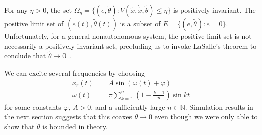 For any $\eta > 0$, the set $\Omega_\eta = \{(e, \tilde{\theta}): V(\tilde{x},
\dot{\tilde{x}}, \tilde{\theta}) \leq \eta\}$ is positively invariant. The
positive limit set of $(e(t),\tilde{\theta}(t))$ is a subset of $E = \{(e,
\tilde{\theta}): e = 0\}$. Unfortunately, for a general nonautonomous system,
the positive limit set is not necessarily a positively invariant set, precluding
us to invoke LaSalle's theorem to conclude that $\tilde{\theta} \rightarrow
0$~\cite{khalil2015nonlinear}.

%
We can excite several frequencies by choosing 
\begin{align*}
    x_r(t) &= A\sin{\left(\omega(t) + \varphi\right)} \\
    \omega(t) &= \pi\sum_{k=1}^n \left(1-\frac{k-1}{n}\right)\sin{k t}
\end{align*}
%
for some constants $\varphi$, $A > 0$, and a sufficiently large $n \in
\mathbb{N}$. Simulation results in the next section suggests that this coaxes
$\tilde{\theta} \rightarrow 0$ even though we were only able to show that
$\tilde{\theta}$ is bounded in theory. 

